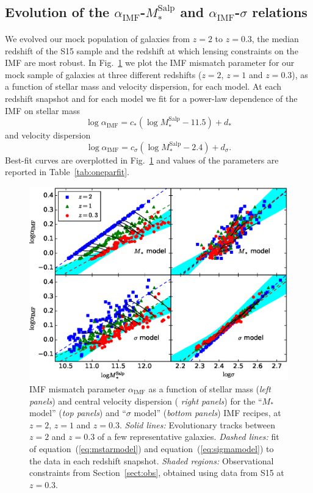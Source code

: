\documentclass[usenatbib]{mnras}
\def\msalp{M_*^{\mathrm{Salp}}}
\def\aimf{\alpha_{\mathrm{IMF}}}
\def\Sref#1{Section~\ref{#1}\xspace}
\def\Fref#1{Fig.~\ref{#1}\xspace}
\def\Tref#1{Table~\ref{#1}\xspace}
\def\Eref#1{equation~(\ref{#1})\xspace}
\begin{document}
\subsection{Evolution of the $\aimf$-$\msalp$ and $\aimf$-$\sigma$ relations}

We evolved our mock population of galaxies from $z=2$ to $z=0.3$, the
median redshift of the S15 sample and the redshift at which lensing constraints on the IMF are most robust. In \Fref{fig:snap} we
plot the IMF mismatch parameter for our mock sample of galaxies at
three different redshifts ($z=2$, $z=1$ and $z=0.3$), as a function of
stellar mass and velocity dispersion, for each model.
At each redshift snapshot and for each model we fit for a power-law dependence of the IMF on stellar mass 
%
\begin{equation}\label{eq:mstarmodel}
\log{\aimf} = c_*(\log{\msalp} - 11.5) + d_*
\end{equation}
%
and velocity dispersion
%
\begin{equation}\label{eq:sigmamodel}
\log{\aimf} = c_\sigma(\log{\msalp} - 2.4) + d_\sigma.
\end{equation}
%
Best-fit curves are overplotted in \Fref{fig:snap} and values of the parameters are reported in \Tref{tab:oneparfit}.
%
\begin{figure}
 \includegraphics[width=\textwidth]{snapshots.eps}
 \caption{ IMF mismatch parameter $\aimf$ as a function of stellar
   mass ({\em left panels}) and central velocity dispersion ({\em
     right panels}) for the ``$M_*$ model'' ({\em top panels}) and
   ``$\sigma$ model'' ({\em bottom panels}) IMF recipes, at $z=2$,
   $z=1$ and $z=0.3$.  {\em Solid lines:} Evolutionary tracks between
   $z=2$ and $z=0.3$ of a few representative galaxies.  {\em Dashed
     lines:} fit of \Eref{eq:mstarmodel} and \Eref{eq:sigmamodel} to the data in each redshift snapshot. {\em
     Shaded regions:} Observational constraints from \Sref{sect:obs},
   obtained using data from S15 at $z=0.3$.   }
 \label{fig:snap}
\end{figure}
\end{document}
